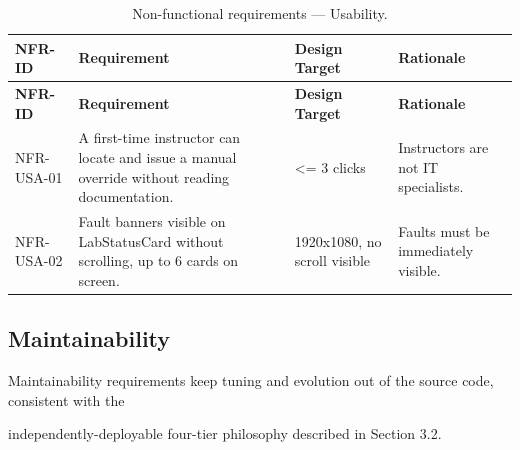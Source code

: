 \begin{longtable}{|L{2.5cm}|L{5.0cm}|L{3.2cm}|L{4.0cm}|}
	\caption{Non-functional requirements --- Usability.} \label{tab:3-19}                                                                                                                \\
	\hline
	\textbf{NFR-ID} & \textbf{Requirement}                                                                          & \textbf{Design Target}       & \textbf{Rationale}                  \\
	\hline
	\endfirsthead
	\hline
	\textbf{NFR-ID} & \textbf{Requirement}                                                                          & \textbf{Design Target}       & \textbf{Rationale}                  \\
	\hline
	\endhead
	\hline
	\endfoot
	\hline
	\endlastfoot
	NFR-USA-01      & A first-time instructor can locate and issue a manual override without reading documentation. & <= 3 clicks                  & Instructors are not IT specialists. \\
	\hline
	NFR-USA-02      & Fault banners visible on LabStatusCard without scrolling, up to 6 cards on screen.            & 1920x1080, no scroll visible & Faults must be immediately visible. \\
	\hline
\end{longtable}


\subsection{Maintainability}
Maintainability requirements keep tuning and evolution out of the source code, consistent with the

independently-deployable four-tier philosophy described in Section 3.2.

